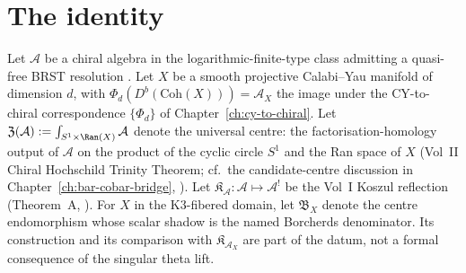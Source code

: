 \section{The identity}
\label{sec:phi-universal-trace-identity}

Let $\mathcal{A}$ be a chiral algebra in the logarithmic-finite-type
class admitting a quasi-free BRST resolution
\cite{VolI}. Let $X$
be a smooth projective Calabi--Yau manifold of dimension $d$, with
$\Phi_d(D^b(\mathrm{Coh}(X))) = \mathcal{A}_X$ the image under the
CY-to-chiral correspondence $\{\Phi_d\}$ of Chapter~\ref{ch:cy-to-chiral}. Let
$\mathfrak{Z}(\mathcal{A}) := \int_{S^1 \times \Ran(X)} \mathcal{A}$
denote the universal centre: the factorisation-homology output of
$\mathcal{A}$ on the product of the cyclic circle $S^1$ and the Ran
space of $X$ \textup{(}Vol~II Chiral Hochschild Trinity Theorem;
cf.\ the candidate-centre discussion in
Chapter~\ref{ch:bar-cobar-bridge}, \cite{VolI}\textup{).}
Let $\mathfrak{K}_{\mathcal{A}}: \mathcal{A} \mapsto \mathcal{A}^!$ be
the Vol~I Koszul reflection \textup{(}Theorem~A,
\cite{VolI}\textup{).} For $X$ in the K$3$-fibered
domain, let $\mathfrak{B}_X$ denote the centre endomorphism whose
scalar shadow is the named Borcherds denominator.  Its construction and
its comparison with $\mathfrak K_{\mathcal A_X}$ are part of the datum,
not a formal consequence of the singular theta lift.


